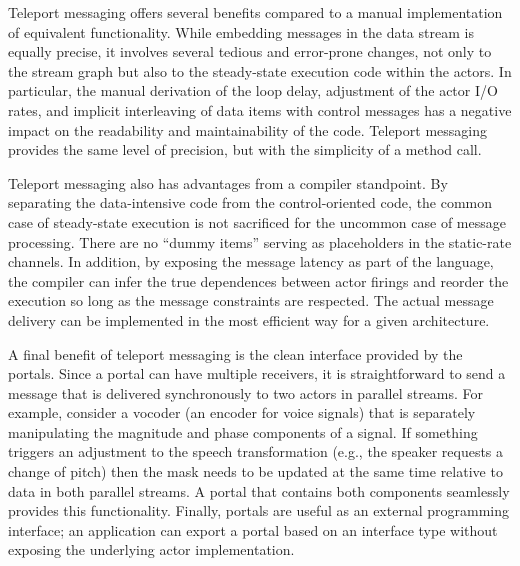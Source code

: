 Teleport messaging offers several benefits compared to a manual
implementation of equivalent functionality.  While embedding messages
in the data stream is equally precise, it involves several tedious
and error-prone changes, not only to the stream graph but also to the
steady-state execution code within the actors.  In particular, the
manual derivation of the loop delay, adjustment of the actor I/O
rates, and implicit interleaving of data items with control messages
has a negative impact on the readability and maintainability of the
code.  Teleport messaging provides the same level of precision, but
with the simplicity of a method call.

Teleport messaging also has advantages from a compiler standpoint.  By
separating the data-intensive code from the control-oriented code, the
common case of steady-state execution is not sacrificed for
the uncommon case of message processing.  There are no ``dummy items''
serving as placeholders in the static-rate channels.  In addition, by
exposing the message latency as part of the language, the compiler can
infer the true dependences between actor firings and reorder the
execution so long as the message constraints are respected.  The
actual message delivery can be implemented in the most efficient way
for a given architecture.

A final benefit of teleport messaging is the clean interface provided
by the portals.  Since a portal can have multiple receivers, it is
straightforward to send a message that is delivered synchronously to
two actors in parallel streams.  For example, consider a vocoder (an
encoder for voice signals) that is separately manipulating the
magnitude and phase components of a signal.  If something triggers an
adjustment to the speech transformation (e.g., the speaker
requests a change of pitch) then the mask needs to be updated at the
same time relative to data in both parallel streams.  A portal that
contains both components seamlessly provides this functionality.
Finally, portals are useful as an external programming interface; an
application can export a portal based on an interface type without
exposing the underlying actor implementation.

